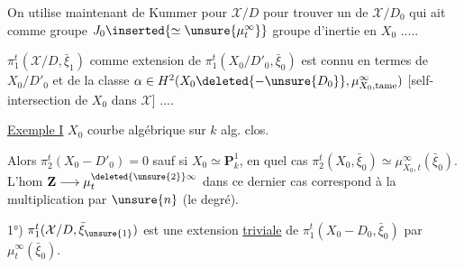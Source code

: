 
On utilise maintenant  de Kummer pour $\mathcal{X}/D$ pour trouver un  de $\mathcal{X}/D_0$ qui ait comme groupe \uline{}  $J_0\inserted{\simeq\unsure{\mu_t^\infty}}$  groupe d'inertie en $X_0$ .....



$\pi_1^t(\mathcal{X}/D,\bar\xi_1)$ comme extension de $\pi_1^t(X_0/D'_0,\bar\xi_0)$ est connu  en termes de $X_0/D'_0$ et de la classe $\alpha\in H^2(X_0\deleted{-\unsure{D_0}},\mu_{X_0,\mathrm{tame}}^\infty)$ [self-intersection de $X_0$ dans $\mathcal{X}$] ....

\uline{Exemple I} $X_0$ courbe algébrique sur $k$ alg. clos.

Alors $\pi_2^t(X_0-D'_0)=0$ sauf si $X_0\simeq\mathbf{P}^1_k$, en quel cas $\pi_2^t(X_0,\bar\xi_0)\simeq\mu_{X_0,t}^{\infty}(\bar\xi_0)$. L'hom $\mathbf{Z}\longrightarrow\mu_t^{\deleted{\unsure{2}}\infty}$ dans ce dernier cas correspond  à la multiplication par $\unsure{n}$ (le degré). 

1°)  $\pi_1^t(\mathcal{X}/D,\bar\xi_{\unsure{1}})$ est une extension \uline{triviale} de $\pi_1^t(X_0-D_0,\bar\xi_0)$ par $\mu_t^\infty(\bar\xi_0)$.
